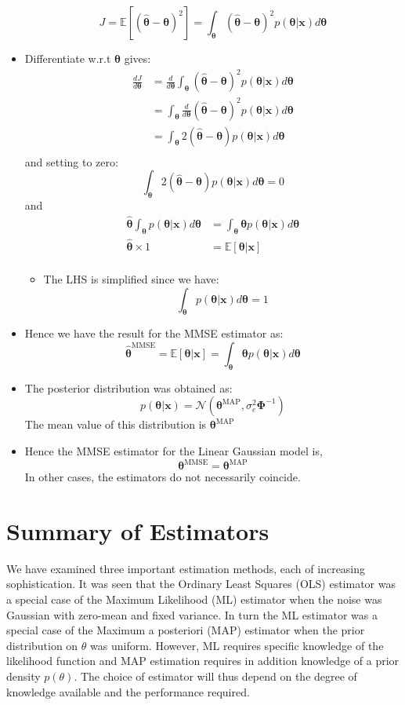 \documentclass[12pt]{article}
\newcommand{\sigd}{\sigma^2}
\newcommand{\mexp}{\mathbb{E}}
\newcommand{\gau}{\mathcal{N}}
\newcommand{\thetab}{\boldsymbol{\theta}}
\newcommand{\prethe}{\hat{\thetab}}
\newcommand{\xb}{\mathbf{x}}
\newcommand{\map}{\textrm{MAP}}
\newcommand{\thetamap}{\thetab^\map}
\begin{document}
\begin{itemize}
    \[
    J = \mexp[(\prethe - \thetab)^2] = \int_{\thetab}(\prethe - \thetab)^2p(\thetab | \xb)d\thetab
    \]
    \item Differentiate w.r.t $\thetab$ gives:
    \begin{align*}
        \frac{dJ}{d\thetab} &= \frac{d}{d\thetab}\int_{\thetab}(\prethe - \thetab)^2p(\thetab | \xb)d\thetab \\
        &= \int_{\thetab}\frac{d}{d\thetab}(\prethe - \thetab)^2p(\thetab | \xb)d\thetab \\
        &= \int_{\thetab} 2(\prethe - \thetab) p(\thetab | \xb)d\thetab \\
    \end{align*}
    and setting to zero:
    \[
    \int_{\thetab} 2(\prethe - \thetab) p(\thetab | \xb)d\thetab = 0
    \]
    and
    \begin{align*}
        \prethe \int_{\thetab}  p(\thetab | \xb)d\thetab &=  \int_{\thetab}  \thetab p(\thetab | \xb)d\thetab \\
        \prethe \times 1 &= \mexp[\thetab | \xb] \\
    \end{align*}
\begin{itemize}
    \item The LHS is simplified since we have:
    \[
    \int_{\thetab}  p(\thetab | \xb)d\thetab = 1
    \]
\end{itemize}
\item Hence we have the result for the MMSE estimator as:
\[
\prethe^{\textrm{MMSE}} = \mexp[\thetab |\xb] = \int_{\thetab} \thetab p(\thetab | \xb) d\thetab
\]
\item The posterior distribution was obtained as:
\[
p(\thetab | \xb) = \gau(\thetamap , \sigd_e \boldsymbol{\Phi}^{-1})
\]
The mean value of this distribution is $\thetamap$
\item Hence the MMSE estimator for the Linear Gaussian model is, 
\[
\thetab^{\textrm{MMSE}} = \thetamap
\]
In other cases, the estimators do not necessarily coincide.
\end{itemize}
\section{Summary of Estimators}
We have examined three important estimation methods, each of increasing sophistication. It was seen that the Ordinary Least Squares
(OLS) estimator was a special case of the Maximum Likelihood (ML)
estimator when the noise was Gaussian with zero-mean and fixed
variance. In turn the ML estimator was a special case of the Maximum a posteriori (MAP) estimator when the prior distribution on $\theta$
was uniform. However, ML requires specific knowledge of the likelihood function and MAP estimation requires in addition knowledge
of a prior density $p(\theta)$. The choice of estimator will thus depend on
the degree of knowledge available and the performance required.
\end{document}
